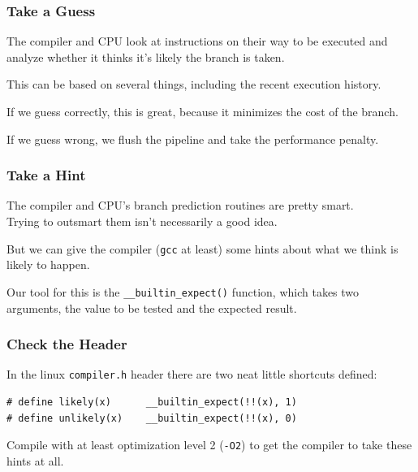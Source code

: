 \begin{frame}
\frametitle{Take a Guess}

The compiler and CPU look at instructions on their way to be executed and analyze whether it thinks it's likely the branch is taken. 

This can be based on several things, including the recent execution history. 

If we guess correctly, this is great, because it minimizes the cost of the branch. 

If we guess wrong, we flush the pipeline and take the performance penalty.

\end{frame}



\begin{frame}
\frametitle{Take a Hint}

The compiler and CPU's branch prediction routines are pretty smart.\\
\quad Trying to outsmart them isn't necessarily a good idea. 

But we can give the compiler (\texttt{gcc} at least) some hints about what we think is likely to happen. 

Our tool for this is the \texttt{\_\_builtin\_expect()} function, which takes two arguments, the value to be tested and the expected result.

\end{frame}



\begin{frame}[fragile]
\frametitle{Check the Header}

In the linux \texttt{compiler.h} header there are two neat little shortcuts defined:

\begin{verbatim}
# define likely(x)      __builtin_expect(!!(x), 1)
# define unlikely(x)    __builtin_expect(!!(x), 0)
\end{verbatim}

Compile with at least optimization level 2 (\texttt{-O2}) to get the compiler to take these hints at all.

\end{frame}



